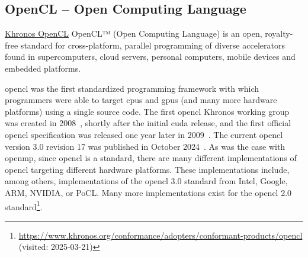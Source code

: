 \subsection{OpenCL -- Open Computing Language}
\label{sec:frameworks:opencl}

\begin{quotebox}{\href{https://www.khronos.org/opencl}{Khronos OpenCL}}
    OpenCL™ (Open Computing Language) is an open, royalty-free standard for cross-platform, parallel programming of diverse accelerators found in supercomputers, cloud servers, personal computers, mobile devices and embedded platforms.
\end{quotebox}

\acrfull{opencl} was the first standardized programming framework with which programmers were able to target \glspl{cpu} and \glspl{gpu} (and many more hardware platforms) using a single source code. 
The first \gls{opencl} Khronos working group was created in 2008~\cite{khronos_opencl_working_group_khronos_2008}, shortly after the initial \gls{cuda} release, and the first official \gls{opencl} specification was released one year later in 2009~\cite{munshi_opencl_2009}. 
The current \gls{opencl} version 3.0 revision 17 was published in October 2024~\cite{khronos_opencl_working_group_opencl_2024}. 
As was the case with \gls{openmp}, since \gls{opencl} is a standard, there are many different implementations of \gls{opencl} targeting different hardware platforms. 
These implementations include, among others, implementations of the \gls{opencl} 3.0 standard from Intel, Google, ARM, NVIDIA, or PoCL. 
Many more implementations exist for the \gls{opencl} 2.0 standard\footnote{\url{https://www.khronos.org/conformance/adopters/conformant-products/opencl} (visited: 2025-03-21)}.

